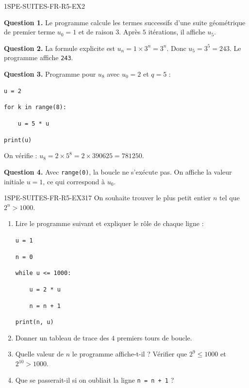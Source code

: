 \begin{corrige}{1SPE-SUITES-FR-R5-EX2}


\textbf{Question 1.} Le programme calcule les termes successifs d'une suite géométrique de premier terme $u_0 = 1$ et de raison $3$. Après $5$ itérations, il affiche $u_5$.

\textbf{Question 2.} La formule explicite est $u_n = 1 \times 3^n = 3^n$. Donc $u_5 = 3^5 = 243$. Le programme affiche \verb|243|.

\textbf{Question 3.} Programme pour $u_8$ avec $u_0 = 2$ et $q = 5$ :

\medskip
\verb|u = 2|

\verb|for k in range(8):|

\verb|    u = 5 * u|

\verb|print(u)|

\medskip
On vérifie : $u_8 = 2 \times 5^8 = 2 \times 390625 = 781250$.


\textbf{Question 4.} Avec \verb|range(0)|, la boucle ne s'exécute pas. On affiche la valeur initiale $u = 1$, ce qui correspond à $u_0$.

\end{corrige}


\begin{exercice}{1SPE-SUITES-FR-R5-EX3}{1}{7}
On souhaite trouver le plus petit entier $n$ tel que $2^n > 1000$.

\begin{enumerate}
  \item Lire le programme suivant et expliquer le rôle de chaque ligne :

\medskip
\verb|u = 1|

\verb|n = 0|

\verb|while u <= 1000:|

\verb|    u = 2 * u|

\verb|    n = n + 1|

\verb|print(n, u)|

  \item Donner un tableau de trace des $4$ premiers tours de boucle.
  \item Quelle valeur de $n$ le programme affiche-t-il ? Vérifier que $2^9 \leq 1000$ et $2^{10} > 1000$.
  \item Que se passerait-il si on oubliait la ligne \texttt{n = n + 1} ?
\end{enumerate}
\end{exercice}

